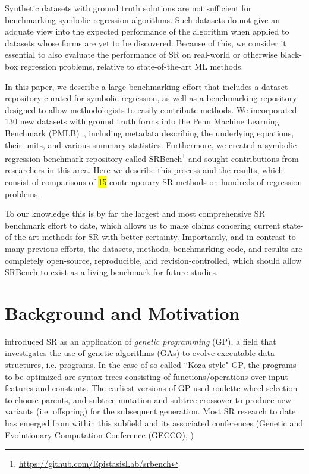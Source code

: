 Synthetic datasets with ground truth solutions are not sufficient for benchmarking symbolic regression algorithms. 
Such datasets do not give an adquate view into the expected performance of the algorithm when applied to datasets whose forms are yet to be discovered. 
Because of this, we consider it essential to also evaluate the performance of SR on real-world or otherwise black-box regression problems, relative to state-of-the-art ML methods. 

In this paper, we describe a large benchmarking effort that includes a dataset repository curated for symbolic regression, as well as a benchmarking repository designed to allow methodologists to easily contribute methods. 
We incorporated 130 new datasets with ground truth forms into the Penn Machine Learning Benchmark (PMLB)~\cite{olsonPMLBLargeBenchmark2017d}, including metadata describing the underlying equations, their units, and various summary statistics. 
Furthermore, we created a symbolic regression benchmark repository called SRBench\footnote{\url{https://github.com/EpistasisLab/srbench}} and sought contributions from researchers in this area. 
Here we describe this process and the results, which consist of comparisons of \hl{15} contemporary SR methods on hundreds of regression problems. 

To our knowledge this is by far the largest and most comprehensive SR benchmark effort to date, which allows us to make claims concering current state-of-the-art methods for SR with better certainty. 
Importantly, and in contrast to many previous efforts, the datasets, methods, benchmarking code, and results are completely open-source, reproducible, and revision-controlled, which should allow SRBench to exist as a living benchmark for future studies.


\section{Background and Motivation}

\citet{kozaGeneticProgrammingProgramming1992a} introduced SR as an application of \textit{genetic programming} (GP), a field that investigates the use of genetic algorithms (GAs) to evolve executable data structures, i.e. programs. 
In the case of so-called ``Koza-style" GP, the programs to be optimized are syntax trees consisting of functions/operations over input features and constants. 
The earliest versions of GP used roulette-wheel selection to choose parents, and subtree mutation and subtree crossover to produce new variants (i.e. offspring) for the subsequent generation. 
Most SR research to date has emerged from within this subfield and its associated conferences (Genetic and Evolutionary Computation Conference (GECCO), )

